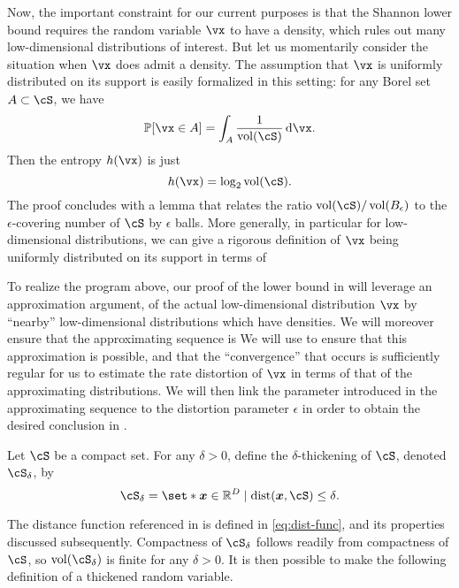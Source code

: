 \documentclass[../../book-main.tex]{subfiles}
\begin{document}
Now, the important constraint for our current purposes is that the Shannon lower
bound requires the random variable $\vx$ to have a density, which rules out many
low-dimensional distributions of interest.
But let us momentarily consider the situation when $\vx$ does admit a density.
The assumption that $\vx$ is uniformly distributed on its support is easily
formalized in this setting: for any Borel set $A \subset \cS$, we have
\begin{equation}
    \Pr[\vx \in A] = \int_{A} \frac{1}{\volume(\cS)} \odif \vx.
\end{equation}
Then the entropy $h(\vx)$ is just
\begin{equation}
    h(\vx) = \log_2 \volume(\cS).
\end{equation}
The proof concludes with a lemma that relates the ratio $\volume(\cS)
/ \volume(B_{\epsilon})$ to the $\epsilon$-covering number of $\cS$ by
$\epsilon$ balls.
More generally, in particular for low-dimensional distributions, we can give
a rigorous definition of $\vx$ being uniformly distributed on its support in
terms of 

To realize the program above, our proof of the lower bound in  will
leverage an approximation argument, of the actual low-dimensional
distribution $\vx$ by ``nearby'' low-dimensional distributions which have
densities.
We will moreover ensure that the approximating sequence is 
We will use  to ensure that this approximation
is possible, and that the ``convergence'' that occurs is sufficiently regular
for us to estimate the rate distortion of $\vx$ in terms of that of the
approximating distributions. 
We will then link the parameter introduced in
the approximating sequence to the distortion parameter $\epsilon$ in order to
obtain the desired conclusion in .


\begin{definition}\label{def:thickening-set}
    Let $\cS$ be a compact set.
    For any $\delta > 0$, define the $\delta$-thickening of $\cS$, denoted
    $\cS_{\delta}$, by
    \begin{equation}
        \cS_{\delta} = \set*{\x \in \R^D \given \mathrm{dist}(\x, \cS) \leq
        \delta}.
    \end{equation}
\end{definition}

The distance function referenced in  is defined in
\eqref{eq:dist-func}, and its properties discussed subsequently. 
Compactness of $\cS_{\delta}$ follows readily from compactness of $\cS$, so
$\volume(\cS_{\delta})$ is finite for any $\delta > 0$. It is then possible to
make the following definition of a thickened random variable.
\end{document}

